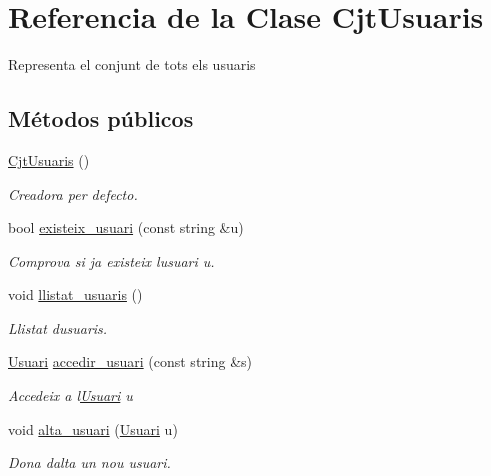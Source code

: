 \hypertarget{class_cjt_usuaris}{}\section{Referencia de la Clase Cjt\+Usuaris}
\label{class_cjt_usuaris}


Representa el conjunt de tots els usuaris 


\subsection*{Métodos públicos}
\begin{DoxyCompactItemize}
\item 
\mbox{\hyperlink{class_cjt_usuaris_a66bec1ef851247d1729414abcfcba4a6}{Cjt\+Usuaris}} ()
\begin{DoxyCompactList}\small\item\em Creadora per defecto. \end{DoxyCompactList}\item 
bool \mbox{\hyperlink{class_cjt_usuaris_a303a749394c11243fdd3c9b6c11d85bc}{existeix\+\_\+usuari}} (const string \&u)
\begin{DoxyCompactList}\small\item\em Comprova si ja existeix l\textquotesingle{}usuari u. \end{DoxyCompactList}\item 
void \mbox{\hyperlink{class_cjt_usuaris_a28020e6e834b3c483198285fb35436fc}{llistat\+\_\+usuaris}} ()
\begin{DoxyCompactList}\small\item\em Llistat d\textquotesingle{}usuaris. \end{DoxyCompactList}\item 
\mbox{\hyperlink{class_usuari}{Usuari}} \mbox{\hyperlink{class_cjt_usuaris_a96d96217021a8ededacc5f89cec9b04a}{accedir\+\_\+usuari}} (const string \&s)
\begin{DoxyCompactList}\small\item\em Accedeix a l\textquotesingle{}\mbox{\hyperlink{class_usuari}{Usuari}} {\itshape u} \end{DoxyCompactList}\item 
void \mbox{\hyperlink{class_cjt_usuaris_a40b8eb64e9dc22e3cf0ee38d52d48e20}{alta\+\_\+usuari}} (\mbox{\hyperlink{class_usuari}{Usuari}} u)
\begin{DoxyCompactList}\small\item\em Dona d\textquotesingle{}alta un nou usuari. \end{DoxyCompactList}\item 

\end{DoxyCompactItemize}

